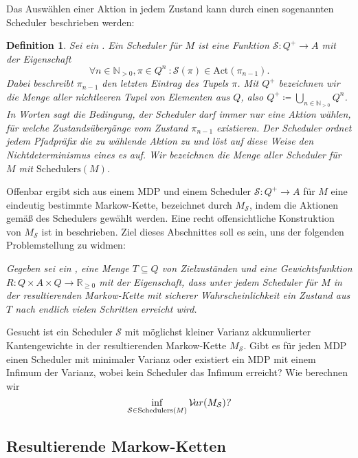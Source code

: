 \documentclass[a4paper]{article}
\newcommand{\mc}{Markow-Kette}
\newtheorem{definition}[satz]{Definition} %
\theoremstyle{nonumberplain}
\begin{document}
Das Auswählen einer Aktion in jedem Zustand kann durch einen sogenannten Scheduler beschrieben werden:
\newcommand{\msch}{\mathrm{Schedulers}}
\begin{definition}
	Sei \mdpex{} ein \mdp{}. Ein Scheduler für $M$ ist eine Funktion $\mathcal{S} : Q^+ \to A$ mit der Eigenschaft
	\begin{equation}
	\forall n \in \mathbb{N}_{>0}, \pi \in Q^n\ : \mathcal{S}(\pi) \in \mathrm{Act}(\pi_{n-1})\text{.}
	\end{equation}
	Dabei beschreibt $\pi_{n-1}$ den letzten Eintrag des Tupels $\pi$. Mit $Q^+$ bezeichnen wir die Menge aller nichtleeren Tupel von Elementen aus $Q$, also $Q^+ \coloneqq \bigcup_{n \in \mathbb{N}_{>0}} Q^n$. In Worten sagt die Bedingung, der Scheduler darf immer nur eine Aktion wählen, für welche Zustandsübergänge vom Zustand $\pi_{n-1}$ existieren. Der Scheduler ordnet jedem Pfadpräfix die zu wählende Aktion zu und löst auf diese Weise den Nichtdeterminismus eines \mdp{}es auf.
	Wir bezeichnen die Menge aller Scheduler für $M$ mit $\mathrm{Schedulers}(M)$.
\end{definition}

\!Offenbar ergibt sich aus einem MDP \mdpex{} und einem Scheduler $\mathcal{S} : Q^+ \to A$ für $M$ eine eindeutig bestimmte \mc{}, bezeichnet durch $M_{\mathcal{S}}$, indem die Aktionen gemäß des Schedulers gewählt werden. Eine recht offensichtliche Konstruktion von $M_{\mathcal{S}}$ ist in \cite{Bai08} beschrieben. Ziel dieses Abschnittes soll es sein, uns der folgenden Problemstellung zu widmen:

\medskip
{ \slshape
	Gegeben sei ein \mdp{} \mdpex{}, eine Menge $T \subseteq Q$ von Zielzuständen und eine Gewichtsfunktion $R : Q \times A \times Q \to \mathbb{R}_{\geq 0}$ mit der Eigenschaft, dass unter jedem Scheduler für $M$ in der resultierenden \mc{} mit sicherer Wahrscheinlichkeit ein Zustand aus $T$ nach endlich vielen Schritten erreicht wird.
	
	Gesucht ist ein Scheduler $\mathcal{S}$ mit möglichst kleiner Varianz akkumulierter Kantengewichte in der resultierenden \mc{} $M_{\mathcal{S}}$. Gibt es für jeden MDP einen Scheduler mit minimaler Varianz oder existiert ein MDP mit einem Infimum der Varianz, wobei kein Scheduler das Infimum erreicht? Wie berechnen wir
	\[\inf_{\mathcal{S} \in \mathrm{Schedulers}(M)}{\mvar(M_\mathcal{S})} \text{\slshape ?}\]
}
\medskip

\subsection{Resultierende \mc{}n}
\end{document}
